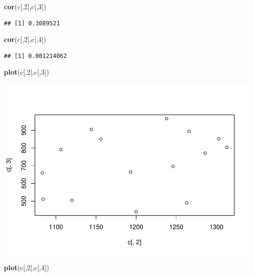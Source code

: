 \documentclass[]{article}
\newenvironment{Shaded}{\begin{snugshade}}{\end{snugshade}}
\newcommand{\KeywordTok}[1]{\textcolor[rgb]{0.13,0.29,0.53}{\textbf{#1}}}
\newcommand{\DecValTok}[1]{\textcolor[rgb]{0.00,0.00,0.81}{#1}}
\newcommand{\NormalTok}[1]{#1}
\begin{document}
\begin{Shaded}
\begin{Highlighting}[]
\KeywordTok{cor}\NormalTok{(c[,}\DecValTok{2}\NormalTok{],c[,}\DecValTok{3}\NormalTok{])}
\end{Highlighting}
\end{Shaded}

\begin{verbatim}
## [1] 0.3089521
\end{verbatim}

\begin{Shaded}
\begin{Highlighting}[]
\KeywordTok{cor}\NormalTok{(c[,}\DecValTok{2}\NormalTok{],c[,}\DecValTok{4}\NormalTok{])}
\end{Highlighting}
\end{Shaded}

\begin{verbatim}
## [1] 0.001214062
\end{verbatim}

\begin{Shaded}
\begin{Highlighting}[]
\KeywordTok{plot}\NormalTok{(c[,}\DecValTok{2}\NormalTok{],c[,}\DecValTok{3}\NormalTok{])}
\end{Highlighting}
\end{Shaded}

\includegraphics{Chapter14_files/figure-latex/unnamed-chunk-20-1.pdf}

\begin{Shaded}
\begin{Highlighting}[]
\KeywordTok{plot}\NormalTok{(c[,}\DecValTok{2}\NormalTok{],c[,}\DecValTok{4}\NormalTok{])}
\end{Highlighting}
\end{Shaded}
\end{document}
